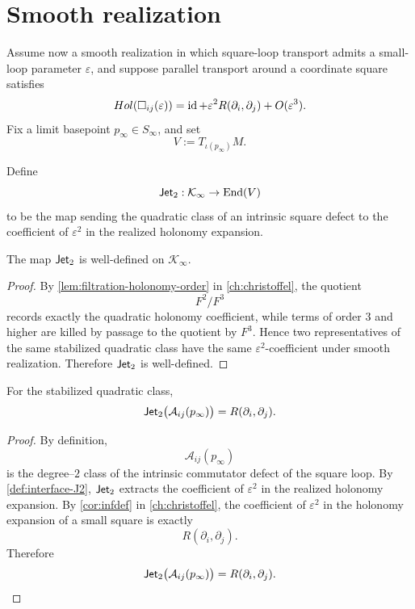 \section{Smooth realization}
\label{sec:interface-smooth}
Assume now a smooth realization in which square-loop transport admits a
small-loop parameter \(\varepsilon\), and suppose parallel transport
around a coordinate square satisfies
\[
	Hol(\square_{ij}(\varepsilon))
	=
	\operatorname{id}
	+
	\varepsilon^2 R(\partial_i,\partial_j)
	+
	O(\varepsilon^3).
\]
Fix a limit basepoint \(p_\infty\in S_\infty\), and set
\[
	V:=T_{\iota(p_\infty)}M.
\]
\begin{definition}
	\label{def:interface-J2}
	Define
	\[
		\mathsf{Jet}_2:\mathcal K_\infty\to \mathrm{End}(V)
	\]
	to be the map sending the quadratic class of an intrinsic square defect
	to the coefficient of \(\varepsilon^2\) in the realized holonomy
	expansion.
\end{definition}
\begin{lemma}
	The map \(\mathsf{Jet}_2\) is well-defined on \(\mathcal K_\infty\).
\end{lemma}
\begin{proof}
	By \cref{lem:filtration-holonomy-order} in \cref{ch:christoffel}, the
	quotient
	\[
		F^2/F^3
	\]
	records exactly the quadratic holonomy coefficient, while terms of order
	\(3\) and higher are killed by passage to the quotient by \(F^3\).
	Hence two representatives of the same stabilized quadratic class have
	the same \(\varepsilon^2\)-coefficient under smooth realization.
	Therefore \(\mathsf{Jet}_2\) is well-defined.
\end{proof}
\begin{theorem}
	\label{thm:interface-curvature}
	For the stabilized quadratic class,
	\[
		\mathsf{Jet}_2\bigl(\mathcal A_{ij}(p_\infty)\bigr)
		=
		R(\partial_i,\partial_j).
	\]
\end{theorem}
\begin{proof}
	By definition,
	\[
		\mathcal A_{ij}(p_\infty)
	\]
	is the degree--\(2\) class of the intrinsic commutator defect of the
	square loop.
	By \cref{def:interface-J2}, \(\mathsf{Jet}_2\) extracts the coefficient of
	\(\varepsilon^2\) in the realized holonomy expansion.
	By \cref{cor:infdef} in \cref{ch:christoffel}, the coefficient of
	\(\varepsilon^2\) in the holonomy expansion of a small square is
	exactly
	\[
		R(\partial_i,\partial_j).
	\]
	Therefore
	\[
		\mathsf{Jet}_2\bigl(\mathcal A_{ij}(p_\infty)\bigr)
		=
		R(\partial_i,\partial_j).
	\]
\end{proof}
